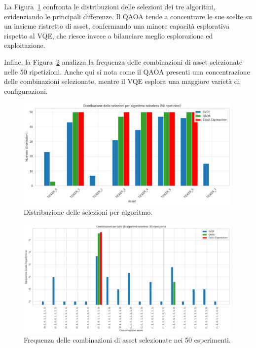 La Figura~\ref{fig:noiseless-risultati-2} confronta le distribuzioni delle 
selezioni dei tre algoritmi, evidenziando le principali differenze. Il QAOA 
tende a concentrare le sue scelte su un insieme ristretto di asset, 
confermando una minore capacità esplorativa rispetto al VQE, che riesce 
invece a bilanciare meglio esplorazione ed exploitazione.

Infine, la Figura~\ref{fig:noiseless-risultati-3} analizza la frequenza 
delle combinazioni di asset selezionate nelle 50 ripetizioni. Anche qui 
si nota come il QAOA presenti una concentrazione delle combinazioni 
selezionate, mentre il VQE esplora una maggiore varietà di configurazioni. 


\begin{figure}[ht!]
    \centering
    \includegraphics[width=0.99\textwidth]{images/risultati/noiseless-risultati-2.png}
    \caption{Distribuzione delle selezioni per algoritmo.}
    \label{fig:noiseless-risultati-2}
\end{figure}
\begin{figure}[ht!]
    \centering
    \includegraphics[width=0.99\textwidth]{images/risultati/noiseless-risultati-3.png}
    \caption{Frequenza delle combinazioni di asset selezionate nei 50 esperimenti.}
    \label{fig:noiseless-risultati-3}
\end{figure}



